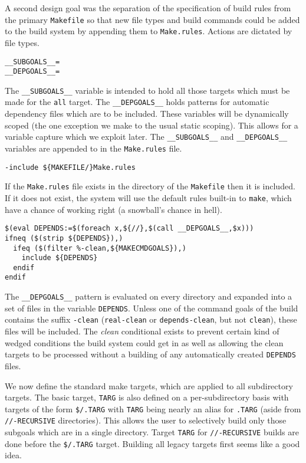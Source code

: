 \documentclass[letterpaper]{article}
\begin{document}
A second design goal was the separation of the specification of
build rules from the primary \verb+Makefile+ so that new file types
and build commands could be added to the build system by appending
them to \verb+Make.rules+.  Actions are dictated by file types.

\begin{verbatim}
__SUBGOALS__=
__DEPGOALS__=
\end{verbatim}
The \verb+__SUBGOALS__+ variable is intended to hold all those targets
which must be made for the \verb+all+ target.  The \verb+__DEPGOALS__+
holds patterns for automatic dependency files which are to be included.
These variables will be
dynamically scoped (the one exception we make to the usual static scoping).
This allows for a variable capture which we exploit later.  The
\verb+__SUBGOALS__+ and \verb+__DEPGOALS__+ variables are
appended to in the \verb+Make.rules+ file.

\begin{verbatim}
-include ${MAKEFILE/}Make.rules
\end{verbatim}
If the \verb+Make.rules+ file exists in the directory of the 
\verb+Makefile+ then it is included.  If it does not exist, the system will
use the default rules built-in to \verb+make+, which have a
chance of working right (a snowball's chance in hell).

\begin{verbatim}
$(eval DEPENDS:=$(foreach x,${//},$(call __DEPGOALS__,$x)))
ifneq ($(strip ${DEPENDS}),)
  ifeq ($(filter %-clean,${MAKECMDGOALS}),)
    include ${DEPENDS}
  endif
endif
\end{verbatim}
The \verb+__DEPGOALS__+ pattern is evaluated on every directory and
expanded into a set of files in the variable \verb+DEPENDS+.  Unless
one of the command goals of the build contains the suffix \verb+-clean+
(\verb+real-clean+ or \verb+depends-clean+, but not \verb+clean+),
these files will be included.  The {\em clean} conditional exists to
prevent certain kind of wedged conditions the build system could get
in as well as allowing the clean targets to be processed without a
building of any automatically created \verb+DEPENDS+ files.

We now define the standard make targets, which are applied to all
subdirectory targets.  The basic target, \verb+TARG+ is also defined
on a per-subdirectory basis with targets of the form \verb+$/.TARG+
with \verb+TARG+ being nearly an alias for \verb+.TARG+ (aside from
\verb+//-RECURSIVE+ directories).  This allows
the user to selectively build only those subgoals which are in a
single directory.  Target \verb+TARG+ for \verb+//-RECURSIVE+ builds are
done before the \verb+$/.TARG+ target.  Building all legacy targets
first seems like a good idea.
\end{document}
